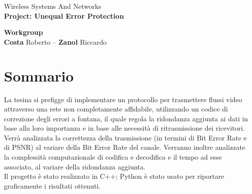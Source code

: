 \documentclass[italian, a4paper, 12pt]{article}
\newcommand{\horline}{\rule{1\linewidth}{0.9pt}}
\begin{document}
\begin{center}
        \Large Wireless Systems And Networks\\
        \huge \textbf{Project: Unequal Error Protection}\\[3mm]
        \begin{framed}
                \Large \textbf{Workgroup} \\[2mm]
                \normalsize \textbf{Costa} Roberto -- \textbf{Zanol} Riccardo
        \end{framed}
\end{center}
\FloatBarrier
\section*{Sommario}
La tesina si prefigge di implementare un protocollo per trasmettere flussi video attraverso una rete non completamente affidabile, utilizzando un codice di correzione degli errori a fontana, il quale regola la ridondanza aggiunta ai dati in base alla loro importanza e in base alle necessità di ritrasmissione dei ricevitori.
Verrà analizzata la correttezza della trasmissione (in termini di Bit Error Rate e di PSNR) al variare della Bit Error Rate del canale. Verranno inoltre analizzate la complessità computazionale di codifica e decodifica e il tempo ad esse associato, al variare della ridondanza aggiunta.\\
Il progetto è stato realizzato in C++; Python è stato usato per riportare graficamente i risultati ottenuti.
\newpage
\end{document}
